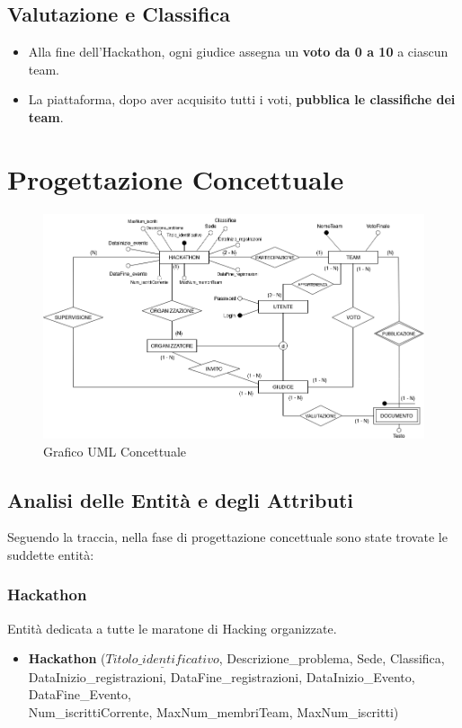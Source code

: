 \documentclass[a4paper, 11pt]{article}
\begin{document}
	\subsection*{Valutazione e Classifica}
	
	\begin{itemize}
		\item Alla fine dell'Hackathon, ogni giudice assegna un \textbf{voto da 0 a 10} a ciascun team.
		\item La piattaforma, dopo aver acquisito tutti i voti, \textbf{pubblica le classifiche dei team}.
	\end{itemize}
	\section{Progettazione Concettuale}
	\begin{figure}[H]
		\centering
		\includegraphics[width=1\textwidth]{../Immagini/EERDiagram_Hackathon}
		\caption[Grafico UML]{Grafico UML Concettuale}
	\end{figure}
	\newpage
	\subsection{Analisi delle Entità e degli Attributi}
	Seguendo la traccia, nella fase di progettazione concettuale sono state trovate le suddette entità:
	\subsubsection{Hackathon}
	Entità dedicata a tutte le maratone di Hacking organizzate.
	\begin{itemize}
		\item \textbf{Hackathon} ($\underline{Titolo\_identificativo}$, Descrizione\_problema, Sede, Classifica,\\ DataInizio\_registrazioni, DataFine\_registrazioni, DataInizio\_Evento, DataFine\_Evento, \\Num\_iscrittiCorrente, MaxNum\_membriTeam, MaxNum\_iscritti)
	\end{itemize}
\end{document}
